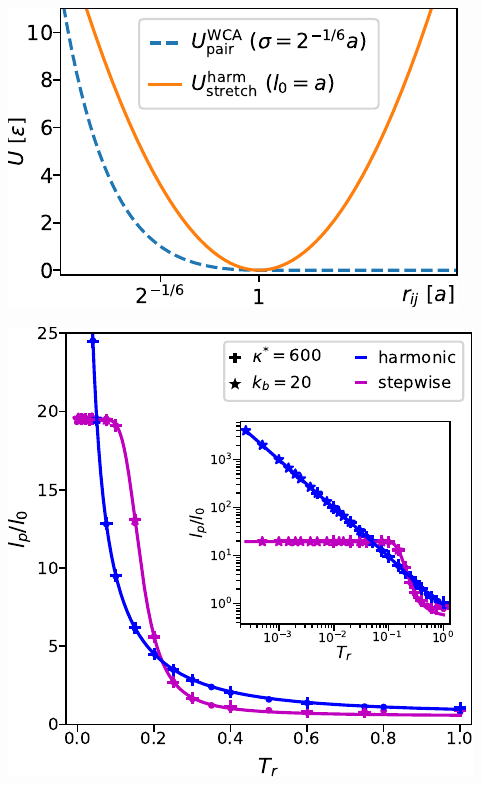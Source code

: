 \documentclass[aspectratio=169]{beamer}
\begin{document}
\begin{frame}[c]{}

  \centering
  \includegraphics[height=\textheight]{../figures/ch5_soft_from_diss/fig-WCA_vs_harmStretch/fig-WCA_vs_harmStretch.pdf}

\end{frame}

\begin{frame}[c]{}

  \centering
  \includegraphics[height=\textheight]{../figures/ch5_soft_from_diss/fig-all_lp_vs_T/fig-lp_vs_T.pdf}

\end{frame}
\end{document}
